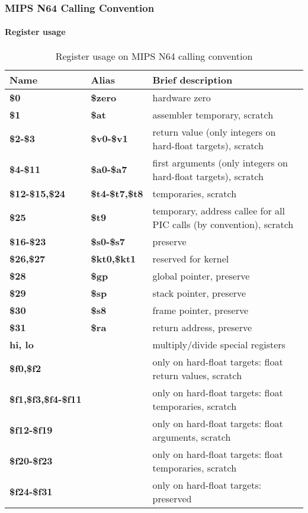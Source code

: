 \subsubsection{MIPS N64 Calling Convention}

\paragraph{Register usage}

\begin{table}[h]
\begin{tabular*}{0.95\textwidth}{lll}
Name                       & Alias                & Brief description\\
\hline
{\bf \$0}                  & {\bf \$zero}         & hardware zero \\
{\bf \$1}                  & {\bf \$at}           & assembler temporary, scratch \\
{\bf \$2-\$3}              & {\bf \$v0-\$v1}      & return value (only integers on hard-float targets), scratch \\
{\bf \$4-\$11}             & {\bf \$a0-\$a7}      & first arguments (only integers on hard-float targets), scratch \\
{\bf \$12-\$15,\$24}       & {\bf \$t4-\$t7,\$t8} & temporaries, scratch \\
{\bf \$25}                 & {\bf \$t9}           & temporary, address callee for all PIC calls (by convention), scratch \\
{\bf \$16-\$23}            & {\bf \$s0-\$s7}      & preserve \\
{\bf \$26,\$27}            & {\bf \$kt0,\$kt1}    & reserved for kernel \\
{\bf \$28}                 & {\bf \$gp}           & global pointer, preserve \\
{\bf \$29}                 & {\bf \$sp}           & stack pointer, preserve \\
{\bf \$30}                 & {\bf \$s8}           & frame pointer, preserve \\
{\bf \$31}                 & {\bf \$ra}           & return address, preserve \\
{\bf hi, lo}               &                      & multiply/divide special registers \\
{\bf \$f0,\$f2}            &                      & only on hard-float targets: float return values, scratch \\
{\bf \$f1,\$f3,\$f4-\$f11} &                      & only on hard-float targets: float temporaries, scratch \\
{\bf \$f12-\$f19}          &                      & only on hard-float targets: float arguments, scratch \\
{\bf \$f20-\$f23}          &                      & only on hard-float targets: float temporaries, scratch \\
{\bf \$f24-\$f31}          &                      & only on hard-float targets: preserved \\
\end{tabular*}
\caption{Register usage on MIPS N64 calling convention}
\end{table}

